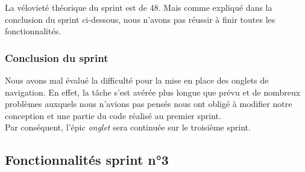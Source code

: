 \documentclass[10pt,a4paper]{article}
\begin{document}
La vélovieté théorique du sprint est de 48. Mais comme expliqué dans la conclusion du sprint ci-dessous, nous n'avons pas réussir à finir toutes les fonctionnalités.

\subsubsection{Conclusion du sprint}
Nous avons mal évalué la difficulté pour la mise en place des onglets de navigation. En effet, la tâche s'est avérée plus longue que prévu et de nombreux problèmes auxquels nous n'avions pas pensés nous ont obligé à modifier notre conception et une partie du code réalisé au premier sprint. \\
Par conséquent, l'épic \textit{onglet} sera continuée sur le troisième sprint.

\newpage

\subsection{Fonctionnalités sprint n°3}
\end{document}
